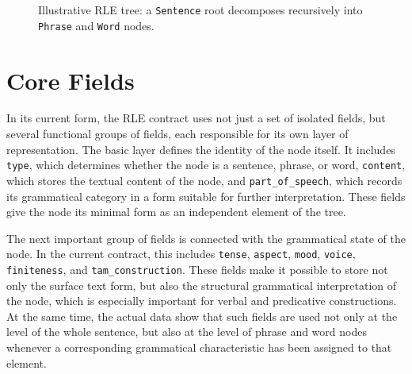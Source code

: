 \documentclass[12pt,a4paper,oneside]{report}
\begin{document}
\begin{figure}[H]
\centering
{}
\caption{Illustrative RLE tree: a \texttt{Sentence} root decomposes recursively into \texttt{Phrase} and \texttt{Word} nodes.}
\label{fig:rletree}
\end{figure}

\section{Core Fields}
In its current form, the RLE contract uses not just a set of isolated fields, but several functional groups of fields, each responsible for its own layer of representation. The basic layer defines the identity of the node itself. It includes \texttt{type}, which determines whether the node is a sentence, phrase, or word, \texttt{content}, which stores the textual content of the node, and \texttt{part\_of\_speech}, which records its grammatical category in a form suitable for further interpretation. These fields give the node its minimal form as an independent element of the tree.

The next important group of fields is connected with the grammatical state of the node. In the current contract, this includes \texttt{tense}, \texttt{aspect}, \texttt{mood}, \texttt{voice}, \texttt{finiteness}, and \texttt{tam\_construction}. These fields make it possible to store not only the surface text form, but also the structural grammatical interpretation of the node, which is especially important for verbal and predicative constructions. At the same time, the actual data show that such fields are used not only at the level of the whole sentence, but also at the level of phrase and word nodes whenever a corresponding grammatical characteristic has been assigned to that element.
\end{document}
